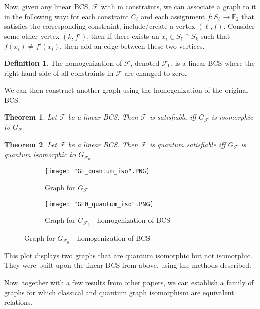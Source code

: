 \documentclass[12pt]{article}
\newtheorem{Theorem}{Theorem}
\theoremstyle{definition}
\newtheorem{defn}{Definition}[section]
\theoremstyle{proposition}
\theoremstyle{lemma}
\begin{document}
Now, given any linear BCS, $\mathcal{F}$ with m constraints, we can associate a graph to it in the following way: for each constraint $C_{\ell}$ and each assignment $f:S_{\ell} \rightarrow \mathbb{F}_2$ that satisfies the corresponding constraint, include/create a vertex $(\ell, f)$. Consider some other vertex $(k, f')$, then if there exists an $x_i \in S_{\ell} \cap S_{k}$ such that $f(x_i) \neq  f'(x_i)$, then add an edge between these two vertices.

\begin{defn}
The homogenization of $\mathcal{F}$, denoted $\mathcal{F}_0$, is a linear BCS where the right hand side of all constraints in $\mathcal{F}$ are changed to zero.
\end{defn}
We can then construct another graph using the homogenization of the original BCS.


\begin{Theorem}
Let $\mathcal{F}$ be a linear BCS. Then $\mathcal{F}$ is satisfiable iff $G_{\mathcal{F}}$ is isomorphic to $G_{\mathcal{F}_0}$
\end{Theorem}

\begin{Theorem}
Let $\mathcal{F}$ be a linear BCS. Then $\mathcal{F}$ is quantum satisfiable iff $G_{\mathcal{F}}$ is quantum isomorphic to $G_{\mathcal{F}_0}$
\end{Theorem}




\begin{figure}
  \begin{subfigure}[b]{0.4\textwidth}
    \texttt{[image: "GF\_quantum\_iso".PNG]}
    \caption{Graph for $G_{\mathcal{F}}$}
    \label{fig:Gf}
  \end{subfigure}
  \begin{subfigure}[b]{0.4\textwidth}
    \texttt{[image: "GF0\_quantum\_iso".PNG]}
    \caption{Graph for $G_{\mathcal{F}_0}$ - homogenization of BCS}
    \label{fig:Gf0}
  \end{subfigure}
\end{figure}

This plot displays two graphs that are quantum isomorphic but not isomorphic. They were built upon the linear BCS from above, using the methods described. 

Now, together with a few results from other papers, we can establish a family of graphs for which classical and quantum graph isomorphism are equivalent relations.
\end{document}
